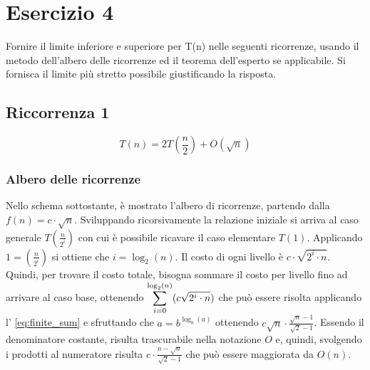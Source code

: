 \documentclass{article}
\begin{document}
\section{Esercizio 4}
Fornire il limite inferiore e superiore per T(n) nelle seguenti ricorrenze, usando il metodo dell’albero delle ricorrenze ed il teorema dell’esperto se applicabile. Si fornisca il limite più stretto possibile giustificando la risposta.

\subsection{Riccorrenza 1}
\begin{equation*}
   T(n) = 2T\left(\frac{n}{2}\right) + O(\sqrt{n})
\end{equation*}

\subsubsection{Albero delle ricorrenze}
Nello schema sottostante, è mostrato l'albero di ricorrenze, partendo dalla $f(n) = c\cdot\sqrt{n}$. Sviluppando ricorsivamente la relazione iniziale si arriva al caso generale $T\left(\frac{n}{2^i}\right)$ con cui è possibile ricavare il caso elementare $T(1)$. Applicando $1 = \left(\frac{n}{2^i}\right)$ si ottiene che $i = \log_2(n)$. Il costo di ogni livello è $c\cdot\sqrt{2^i\cdot n}$. Quindi, per trovare il costo totale, bisogna sommare il costo per livello fino ad arrivare al caso base, ottenendo $\mathlarger{\sum}_{i=0}^{\log_2(n)} (c\sqrt{2^i\cdot n})$ che può essere risolta applicando l' \cref{eq:finite_sum} e sfruttando che $a = b^{\log_b(a)}$ ottenendo $c\sqrt{n}\cdot \frac{\sqrt{n}-1}{\sqrt{2}-1}$. Essendo il denominatore costante, risulta trascurabile nella notazione $O$ e, quindi, svolgendo i prodotti al numeratore risulta $c\cdot\frac{n-\sqrt{n}}{\sqrt{2}-1}$ che può essere maggiorata da $O(n)$. 


\end{document}
